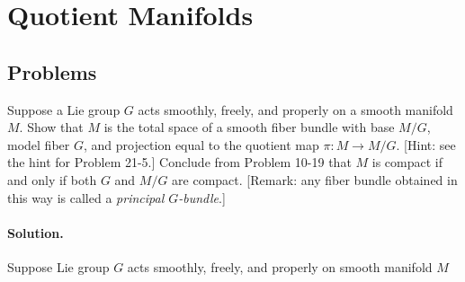 \section{Quotient Manifolds}

\subsection*{ Problems }

\begin{exercise}
Suppose a Lie group $G$ acts smoothly, freely, and properly on a smooth manifold $M$. Show that $M$ is the total space of a smooth fiber bundle with base $M/G$, model fiber $G$, and projection equal to the quotient map $\pi\colon M\to M/G$. [Hint: see the hint for Problem 21-5.] Conclude from Problem 10-19 that $M$ is compact if and only if both $G$ and $M/G$ are compact. [Remark: any fiber bundle obtained in this way is called a \emph{principal $G$-bundle}.]
\end{exercise}
\paragraph{Solution.}

Suppose Lie group $G$ acts smoothly, freely, and properly on smooth manifold $M$
